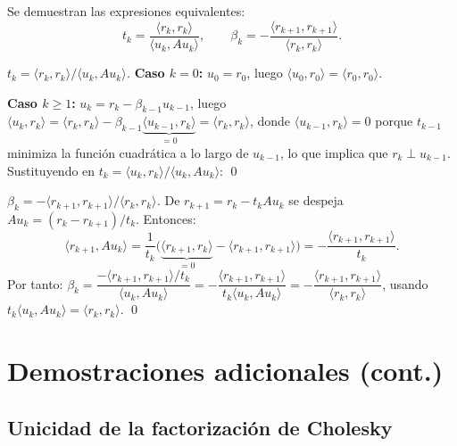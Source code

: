 \documentclass[11pt,a4paper]{article}
\begin{document}
Se demuestran las expresiones equivalentes:
\[
  t_k = \frac{\langle r_k,r_k\rangle}{\langle u_k,Au_k\rangle}, \qquad
  \beta_k = -\frac{\langle r_{k+1},r_{k+1}\rangle}{\langle r_k,r_k\rangle}.
\]

\begin{proof}[$t_k = \langle r_k,r_k\rangle/\langle u_k,Au_k\rangle$]
\textbf{Caso $k=0$:} $u_0=r_0$, luego $\langle u_0,r_0\rangle=\langle r_0,r_0\rangle$. \checkmark

\textbf{Caso $k\ge1$:} $u_k = r_k - \beta_{k-1}u_{k-1}$, luego
$\langle u_k,r_k\rangle = \langle r_k,r_k\rangle - \beta_{k-1}\underbrace{\langle u_{k-1},r_k\rangle}_{=0}
= \langle r_k,r_k\rangle$,
donde $\langle u_{k-1},r_k\rangle = 0$ porque $t_{k-1}$ minimiza la función cuadrática
a lo largo de $u_{k-1}$, lo que implica que $r_k \perp u_{k-1}$.
Sustituyendo en $t_k = \langle u_k,r_k\rangle/\langle u_k,Au_k\rangle$: \qed
\end{proof}

\begin{proof}[$\beta_k = -\langle r_{k+1},r_{k+1}\rangle/\langle r_k,r_k\rangle$]
De $r_{k+1} = r_k - t_kAu_k$ se despeja $Au_k = (r_k-r_{k+1})/t_k$. Entonces:
\[
  \langle r_{k+1},Au_k\rangle
  = \frac{1}{t_k}\bigl(\underbrace{\langle r_{k+1},r_k\rangle}_{=0} - \langle r_{k+1},r_{k+1}\rangle\bigr)
  = -\frac{\langle r_{k+1},r_{k+1}\rangle}{t_k}.
\]
Por tanto:
$\beta_k = \dfrac{-\langle r_{k+1},r_{k+1}\rangle/t_k}{\langle u_k,Au_k\rangle}
= -\dfrac{\langle r_{k+1},r_{k+1}\rangle}{t_k\langle u_k,Au_k\rangle}
= -\dfrac{\langle r_{k+1},r_{k+1}\rangle}{\langle r_k,r_k\rangle}$,
usando $t_k\langle u_k,Au_k\rangle = \langle r_k,r_k\rangle$. \qed
\end{proof}

\section{Demostraciones adicionales (cont.)}
\label{sec:demos_adicionales2}

\subsection{Unicidad de la factorización de Cholesky}
\label{sec:cholesky_unicidad}
\end{document}
